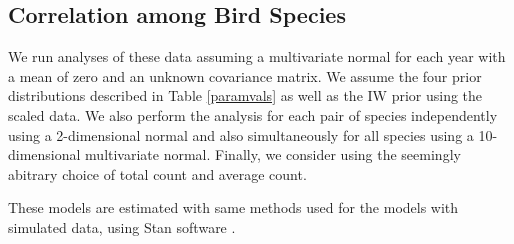 \documentclass[12pt]{article}
\begin{document}
%

\subsection{Correlation among Bird Species}

We run analyses of these data assuming a multivariate normal for each year with a mean of zero and an unknown covariance matrix. We assume the four prior distributions described in Table \ref{paramvals} as well as the IW prior using the scaled data. We also perform the analysis for each pair of species independently using a 2-dimensional normal and also simultaneously for all species using a 10-dimensional multivariate normal. Finally, we consider using the seemingly abitrary choice of total count and average count. 

These models are estimated with same methods used for the models with simulated data, using Stan software \citep{stan2014}. 
\end{document}
